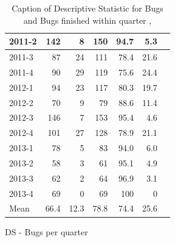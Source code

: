 \documentclass[UKenglish]{ifimaster}  %
\begin{document}
\begin{appendices}
\begin{table}[!htbp]
\begin{adjustwidth}{-2.5cm}{}
\begin{subfigure}[b]{0.4\textwidth}
{\begin{tabular}{ | l | r | r | r | r | r | r | }
2011-2 & 142 & 8 & 150 & 94.7 & 5.3\\ \hline
2011-3 & 87 & 24 & 111 & 78.4 & 21.6\\ \hline
2011-4 & 90 & 29 & 119 & 75.6 & 24.4 \\ \hline
2012-1 & 94 & 23 & 117 & 80.3 & 19.7 \\ \hline
2012-2 & 70 & 9 & 79 & 88.6 & 11.4\\ \hline
2012-3 & 146 & 7 & 153 & 95.4 & 4.6\\ \hline
2012-4 & 101 & 27 & 128 & 78.9& 21.1 \\ \hline
2013-1 & 78 & 5 & 83 & 94.0 & 6.0 \\ \hline
2013-2 & 58 & 3 & 61 & 95.1 & 4.9 \\ \hline
2013-3 & 62 & 2 & 64 & 96.9 & 3.1 \\ \hline
2013-4 & 69 & 0 & 69 & 100 & 0 \\ \hline
Mean & 66.4&12.3&78.8&74.4&25.6 \\ \hline
\end{tabular}
}
\caption{DS - Bugs per quarter}
 \label{DS:FTPQ:2}
\end{subfigure}
\end{adjustwidth}
\caption[Optional caption for list of figures]{Caption of Descriptive Statistic for Bugs and Bugs finished within quarter  , }
\label{DS:2:5} %
\end{table}
 




\end{appendices}
\end{document}
